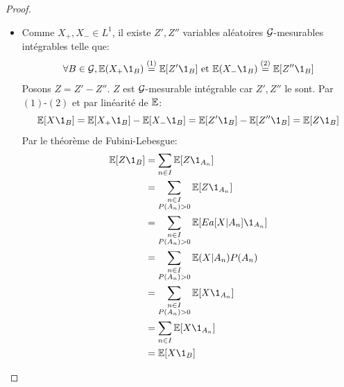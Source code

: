 \documentclass[]{report}
\begin{document}
    \begin{proof}
        \begin{itemize}
            \item Comme $X_+,X_-\in L^1$, il existe $Z',Z''$ variables aléatoires $\mathcal{G}$-mesurables intégrables telle que:
            \[\forall B\in \Gr, \Ea(X_+\1_B)\overset{(1)}{=}\Ea[Z'\1_B]\text{ et }\Ea(X_-\1_B)\overset{(2)}{=}\Ea[Z''\1_B]\]
            Posons $Z=Z'-Z''$. $Z$ est $\mathcal{G}$-mesurable intégrable car $Z',Z''$ le sont. Par $(1)$-$(2)$ et par linéarité de $\mathbb{E}$:
            \[\Ea[X\1_B]=\Ea[X_+\1_B]-\Ea[X_- \1_B]=\Ea[Z'\1_B]-\Ea[Z''\1_B]=\Ea[Z\1_B]\]
            Par le théorème de Fubini-Lebesgue:
            \begin{align*}
                \Ea[Z\1_B]&=\sum_{n\in I}\Ea[Z\1_{A_n}]\\
                &=\sum_{\substack{n\in I\\ P(A_n)>0}}\Ea [Z\1_{A_n}]\\
                &=\sum_{\substack{n\in I\\P(A_n)>0}} \Ea[Ea[X|A_n]\1_{A_n}]\\
                &=\sum_{\substack{n\in I\\ P(A_n)>0}}\Ea(X|A_n)P(A_n)\\
                &=\sum_{\substack{n\in I\\ P(A_n)>0}}\Ea[X \1_{A_n}]\\
                &=\sum_{n\in I} \Ea[X\1_{A_n}]\\
                &=\Ea[X\1_B]
            \end{align*}
        \end{itemize}
    \end{proof}
\end{document}
